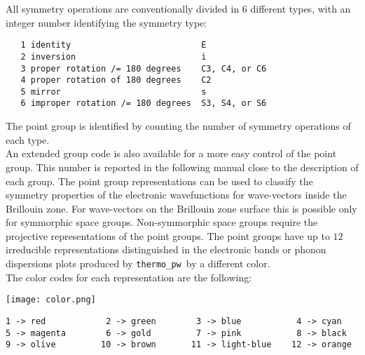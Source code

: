 \documentclass[12pt,a4paper,twoside]{report}
\def\tpw{\texttt{thermo\_pw}}
\begin{document}
All symmetry operations are conventionally divided in $6$ 
different types, with an integer number identifying the symmetry type:
\begin{tcolorbox}
\begin{footnotesize}
\begin{verbatim}
   1 identity                          E
   2 inversion                         i
   3 proper rotation /= 180 degrees    C3, C4, or C6
   4 proper rotation of 180 degrees    C2
   5 mirror                            s
   6 improper rotation /= 180 degrees  S3, S4, or S6
\end{verbatim}
\end{footnotesize}
\end{tcolorbox}
The point group is identified by counting the number of symmetry operations of 
each type. \\
An extended group code is also available for a more easy control of the
point group. This number is reported in the following manual close
to the description of each group.
The point group representations can be used to classify the symmetry properties 
of the electronic wavefunctions for wave-vectors inside the Brillouin zone. 
For wave-vectors on the Brillouin zone surface this is possible only for 
symmorphic space groups. Non-symmorphic space groups require the projective 
representations of the point groups. 
The point groups have up to $12$ irreducible 
representations distinguished in the electronic bands or phonon dispersions
plots produced by \tpw\ by a different color. \\
The color codes for each representation are the following:
\begin{center}
\texttt{[image: color.png]} 
\end{center}
\begin{tcolorbox}
\begin{footnotesize}
\begin{verbatim}
1 -> red            2 -> green        3 -> blue           4 -> cyan
5 -> magenta        6 -> gold         7 -> pink           8 -> black
9 -> olive         10 -> brown       11 -> light-blue    12 -> orange
\end{verbatim} 
\end{footnotesize}
\end{tcolorbox}
\end{document}
